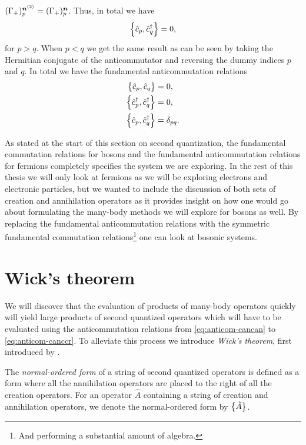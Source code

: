             $(\Gamma_{+})^{\boldsymbol{n}^{(2)}}_{p} = (\Gamma_{+})^{\boldsymbol{n}}_{p}$.
            Thus, in total we have
            \begin{align}
                \left\{\hat{c}_{p}, \hat{c}_{q}^{\dagger}\right\} = 0,
            \end{align}
            for $p > q$.
            When $p < q$ we get the same result as can be seen by taking the
            Hermitian conjugate of the anticommutator and reversing the dummy
            indices $p$ and $q$.
            In total we have the fundamental anticommutation relations
            \begin{align}
                \left\{\hat{c}_{p}, \hat{c}_{q}\right\} &= 0,
                \label{eq:anticom-cancan}
                \\
                \left\{\hat{c}_{p}^{\dagger}, \hat{c}_{q}^{\dagger}\right\} &= 0,
                \label{eq:anticom-ccrccr}
                \\
                \left\{\hat{c}_{p}, \hat{c}_{q}^{\dagger}\right\} &= \delta_{pq}.
                \label{eq:anticom-canccr}
            \end{align}

            As stated at the start of this section on second quantization, the
            fundamental commutation relations for bosons and the fundamental
            anticommutation relations for fermions completely specifies the
            system we are exploring.
            In the rest of this thesis we will only look at fermions as we will
            be exploring electrons and electronic particles, but we wanted to
            include the discussion of both sets of creation and annihilation
            operators as it provides insight on how one would go about
            formulating the many-body methods we will explore for bosons as
            well.
            By replacing the fundamental anticommutation relations with the
            symmetric fundamental commutation relations\footnote{%
                And performing a substantial amount of algebra.%
            } one can look at bosonic systems.



    \section{Wick's theorem}
        We will discover that the evaluation of products of many-body operators
        quickly will yield large products of second quantized operators which
        will have to be evaluated using the anticommutation relations from
        \autoref{eq:anticom-cancan} to \autoref{eq:anticom-canccr}.
        To alleviate this process we introduce \emph{Wick's theorem}, first
        introduced by \citeauthor{wick} \cite{wick}.
        \begin{definition}
            \label{def:normal-ordered-form}
            The \emph{normal-ordered form} of a string of second quantized
            operators is defined as a form where all the annihilation operators
            are placed to the right of all the creation operators.
            For an operator $\hat{A}$ containing a string of creation and
            annihilation operators, we denote the normal-ordered form by
            $\bigl\{ \hat{A} \bigr\}$.
        \end{definition}

